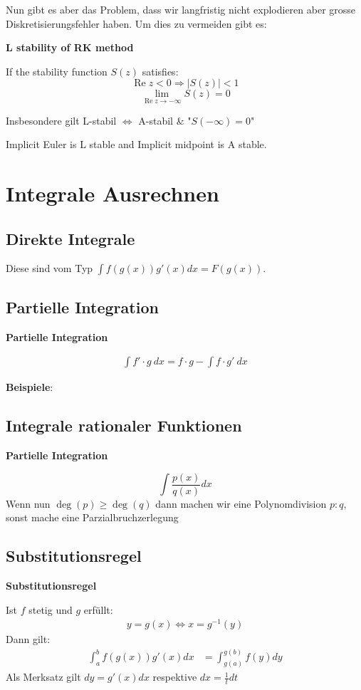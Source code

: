 \documentclass{sciposter}
\newenvironment{method}[1]{\begin{mdframed}[backgroundcolor=blue!10,innertopmargin=15pt, innerbottommargin=15pt, nobreak=true]
		\textbf{#1 }
	}
	{ 
	\end{mdframed}
}
\begin{document}
\begin{multicols}{2}
Nun gibt es aber das Problem, dass wir langfristig nicht explodieren aber grosse Diskretisierungsfehler haben. Um dies zu vermeiden gibt es:

\begin{method}{L stability of RK method}
	If the stability function $S(z)$ satisfies:
	$$\operatorname{Re} z < 0 \Rightarrow |S(z)| < 1$$
	$$\lim\limits_{\operatorname{Re}z \to - \infty} S(z) = 0$$
	
	Insbesondere gilt L-stabil $\iff$ A-stabil \& "$S(-\infty) = 0$"
\end{method}

Implicit Euler is L stable and Implicit midpoint is A stable.

\section*{Integrale Ausrechnen}


\subsection*{Direkte Integrale}
Diese sind vom Typ $\int f(g(x)) g'(x) dx = F(g(x))$.

\subsection*{Partielle Integration}
\begin{method}{Partielle Integration}
	\begin{align*}
	\int f' \cdot g \ dx = f \cdot g - \int f \cdot g' \  dx
	\end{align*}
\end{method}
\textbf{Beispiele}:


\subsection*{Integrale rationaler Funktionen}
\begin{method}{Partielle Integration}
	$$\int \frac{p(x)}{q(x)} dx$$
	Wenn nun $\deg(p) \geq \deg(q)$ dann machen wir eine Polynomdivision $p:q$, sonst mache eine Parzialbruchzerlegung
\end{method}

\subsection*{Substitutionsregel}
\begin{method}{Substitutionsregel}
	Ist $f$ stetig und $g$ erfüllt:
	\begin{align*}
	y = g(x) \iff x = g^{-1}(y)
	\end{align*}
	Dann gilt:
	\begin{align*}
	\int_a ^b f(g(x))g'(x) dx &= \int_{g(a)}^{g(b)} f(y) dy
	\end{align*}
	Als Merksatz gilt $dy = g'(x) dx$ respektive $dx = \frac{1}{t} dt$
\end{method}



\end{multicols}
\end{document}
